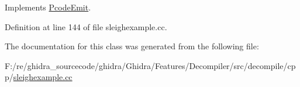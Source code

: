 Implements \mbox{\hyperlink{class_pcode_emit_a00f25999bbdea677b82577b21bdfff8e}{Pcode\+Emit}}.



Definition at line 144 of file sleighexample.\+cc.



The documentation for this class was generated from the following file\+:\begin{DoxyCompactItemize}
\item 
F\+:/re/ghidra\+\_\+sourcecode/ghidra/\+Ghidra/\+Features/\+Decompiler/src/decompile/cpp/\mbox{\hyperlink{sleighexample_8cc}{sleighexample.\+cc}}\end{DoxyCompactItemize}
